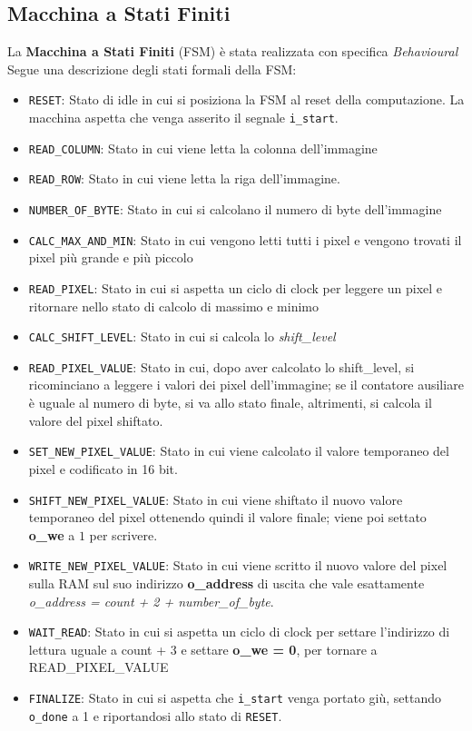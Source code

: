 \documentclass{article}
\begin{document}
\subsection{Macchina a Stati Finiti}
\label{FSM}

La \textbf{Macchina a Stati Finiti} (FSM) è stata realizzata con specifica \textit{Behavioural} 
Segue una descrizione degli stati formali della FSM:

\begin{itemize}
\item \texttt{RESET}: Stato di idle in cui si posiziona la FSM al reset della computazione. La macchina aspetta che venga asserito il segnale \texttt{i\_start}.
\item \texttt{READ\_COLUMN}: Stato in cui viene letta la colonna dell'immagine
\item \texttt{READ\_ROW}: Stato in cui viene letta la riga dell'immagine.
\item \texttt{NUMBER\_OF\_BYTE}: Stato in cui si calcolano il numero di byte dell'immagine
\item \texttt{CALC\_MAX\_AND\_MIN}: Stato in cui vengono letti tutti i pixel e vengono trovati il pixel più grande e più piccolo
\item \texttt{READ\_PIXEL}: Stato in cui si aspetta un ciclo di clock per leggere un pixel e ritornare nello stato di calcolo di massimo e minimo 
\item \texttt{CALC\_SHIFT\_LEVEL}: Stato in cui si calcola lo \textit{shift\_level}
\item \texttt{READ\_PIXEL\_VALUE}: Stato in cui, dopo aver calcolato lo shift\_level, si ricominciano a leggere i valori dei pixel dell'immagine; se il contatore ausiliare è uguale al numero di byte, si va allo stato finale, altrimenti, si calcola il valore del pixel shiftato.
\item \texttt{SET\_NEW\_PIXEL\_VALUE}: Stato in cui viene calcolato il valore temporaneo del pixel e codificato in 16 bit.
\item \texttt{SHIFT\_NEW\_PIXEL\_VALUE}: Stato in cui viene shiftato il nuovo valore temporaneo del pixel ottenendo quindi il valore finale; viene poi settato \textbf{o\_we} a $1$ per scrivere.
\item \texttt{WRITE\_NEW\_PIXEL\_VALUE}: Stato in cui viene scritto il nuovo valore del pixel sulla RAM sul suo indirizzo \textbf{o\_address} di uscita che vale esattamente \textit{o\_address = count + 2 + number\_of\_byte}.
\item \texttt{WAIT\_READ}: Stato in cui si aspetta un ciclo di clock per settare l'indirizzo di lettura uguale a count + 3 e settare \textbf{o\_we = 0}, per tornare a READ\_PIXEL\_VALUE
\item \texttt{FINALIZE}: Stato in cui si aspetta che \texttt{i\_start} venga portato giù, settando \texttt{o\_done} a 1 e riportandosi allo stato di \texttt{RESET}.
\end{itemize}
\end{document}
